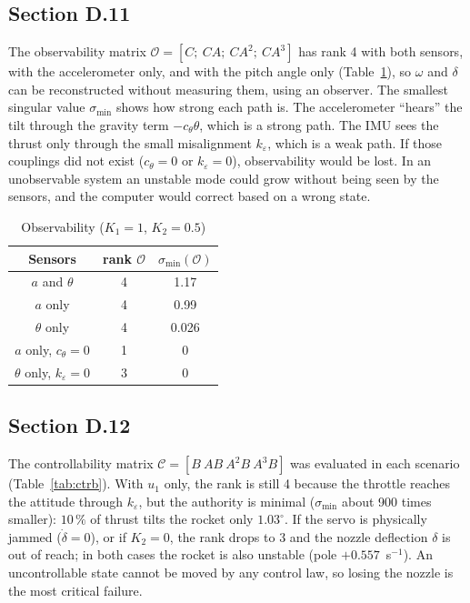 \documentclass[article, 11pt]{IEEEtran}   %
\begin{document}
\subsection{Section D.11}
The observability matrix $\mathcal{O}=[C;\ CA;\ CA^2;\ CA^3]$ has rank 4 with both sensors, with the accelerometer only, and with the pitch angle only (Table~\ref{tab:obs}), so $\omega$ and $\delta$ can be reconstructed without measuring them, using an observer. The smallest singular value $\sigma_{\min}$ shows how strong each path is. The accelerometer ``hears'' the tilt through the gravity term $-c_\theta\theta$, which is a strong path. The IMU sees the thrust only through the small misalignment $k_\varepsilon$, which is a weak path. If those couplings did not exist ($c_\theta=0$ or $k_\varepsilon=0$), observability would be lost. In an unobservable system an unstable mode could grow without being seen by the sensors, and the computer would correct based on a wrong state.

\begin{table}[H]
\centering
\caption{Observability ($K_1=1$, $K_2=0.5$)}
\label{tab:obs}
\begin{tabular}{|c|c|c|}
\hline
Sensors & rank $\mathcal{O}$ & $\sigma_{\min}(\mathcal{O})$ \\
\hline
$a$ and $\theta$ & 4 & 1.17 \\
$a$ only & 4 & 0.99 \\
$\theta$ only & 4 & 0.026 \\
$a$ only, $c_\theta=0$ & 1 & 0 \\
$\theta$ only, $k_\varepsilon=0$ & 3 & 0 \\
\hline
\end{tabular}
\end{table}

\subsection{Section D.12}
The controllability matrix $\mathcal{C}=[B\ AB\ A^2B\ A^3B]$ was evaluated in each scenario (Table~\ref{tab:ctrb}). With $u_1$ only, the rank is still 4 because the throttle reaches the attitude through $k_\varepsilon$, but the authority is minimal ($\sigma_{\min}$ about 900 times smaller): $10\,\text{\%}$ of thrust tilts the rocket only $1.03^\circ$. If the servo is physically jammed ($\dot\delta=0$), or if $K_2=0$, the rank drops to 3 and the nozzle deflection $\delta$ is out of reach; in both cases the rocket is also unstable (pole $+0.557$~s$^{-1}$). An uncontrollable state cannot be moved by any control law, so losing the nozzle is the most critical failure.
\end{document}
